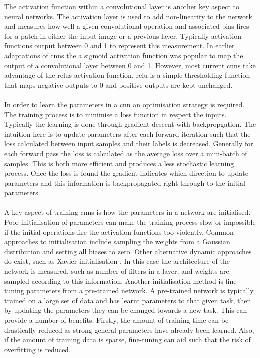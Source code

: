 The activation function within a convolutional layer is another key aspect to neural networks. The activation layer is used to add non-linearity to the network and measures how well a given convolutional operation and associated bias fires for a patch in either the input image or a previous layer. Typically activation functions output between 0 and 1 to represent this measurement. In earlier adaptations of \glspl{cnn} the a sigmoid activation function was popular to map the output of a convolutional layer between 0 and 1. However, most current \glspl{cnn} take advantage of the \glspl{relu} activation function. \gls{relu} is a simple thresholding function that maps negative outputs to 0 and positive outputs are kept unchanged.
\\\\
In order to learn the parameters in a \gls{cnn} an optimisation strategy is required. The training process is to minimise a loss function in respect the inputs. Typically the learning is done through gradient descent with backpropgation. The intuition here is to update parameters after each forward iteration such that the loss calculated between input samples and their labels is decreased. Generally for each forward pass the loss is calculated as the average loss over a mini-batch of samples. This is both more efficient and produces a less stochastic learning process. Once the loss is found the gradient indicates which direction to update parameters and this information is backpropagated right through to the initial parameters.
\\\\
A key aspect of training \glspl{cnn} is how the parameters in a network are initialised. Poor initialisation of parameters can make the training process slow or impossible if the initial operations fire the activation functions too violently. Common approaches to initialisation include sampling the weights from a Gaussian distribution and setting all biases to zero. Other alternative dynamic approaches do exist, such as Xavier initialisation \cite{xavier}. In this case the architecture of the network is measured, such as number of filters in a layer, and weights are sampled according to this information. Another initialisation method is fine-tuning parameters from a pre-trained network. A pre-trained network is typically trained on a large set of data and has learnt parameters to that given task, then by updating the parameters they can be changed towards a new task. This can provide a number of benefits. Firstly, the amount of training time can be drastically reduced as strong general parameters have already been learned. Also, if the amount of training data is sparse, fine-tuning can aid such that the risk of overfitting is reduced.
